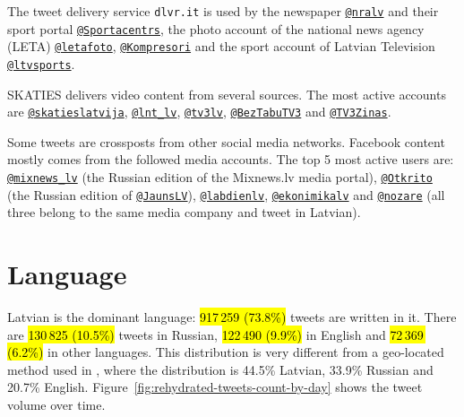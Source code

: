 \documentclass{IOS-Book-Article}
\makeatletter
\newcommand{\sn}[1]{\href{https://twitter.com/#1}{\texttt{@#1}}}
\makeatother
\begin{document}
The tweet delivery service \texttt{dlvr.it} is used by the newspaper \sn{nralv} and their sport portal \sn{Sportacentrs}, the photo account of the national news agency (LETA) \sn{letafoto}, \sn{Kompresori} and the sport account of Latvian Television \sn{ltvsports}.

SKATIES delivers video content from several sources. The most active accounts are \sn{skatieslatvija}, \sn{lnt\_lv}, \sn{tv3lv}, \sn{BezTabuTV3} and \sn{TV3Zinas}.

Some tweets are crossposts from other social media networks. Facebook content mostly comes from the followed media accounts. The top 5 most active users are: \sn{mixnews\_lv} (the Russian edition of the Mixnews.lv media portal), \sn{Otkrito} (the Russian edition of \sn{JaunsLV}), \sn{labdienlv}, \sn{ekonimikalv} and \sn{nozare} (all three belong to the same media company and tweet in Latvian).




\section{Language}
\label{sec:language}



Latvian is the dominant language: \hl{917\,259 (73.8\%)} tweets are written in it.\footnotemark{} There are \hl{130\,825 (10.5\%)} tweets in Russian, \hl{122\,490 (9.9\%)} in English and \hl{72\,369\, (6.2\%)} in other languages. This distribution is very different from a geo-located method used in \cite{milajevs:2017:BUCC}, where the distribution is 44.5\% Latvian, 33.9\% Russian and 20.7\% English. Figure~\ref{fig:rehydrated-tweets-count-by-day} shows the tweet volume over time.
\end{document}
